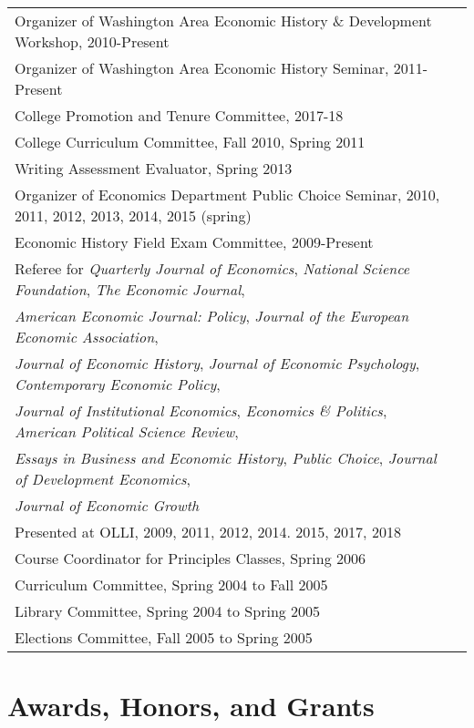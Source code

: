 \documentclass[11pt,fullpage]{article}
\begin{document}
\begin{tabular}{ll}
	Organizer of Washington Area Economic History \& Development Workshop, 2010-Present \\
	Organizer of Washington Area Economic History Seminar, 2011-Present \\
	College Promotion and Tenure Committee, 2017-18 \\
	College Curriculum Committee, Fall 2010, Spring 2011 \\
	Writing Assessment Evaluator, Spring 2013 \\ 
	Organizer of Economics Department Public Choice Seminar, 2010, 2011, 2012, 2013, 2014, 2015 (spring) \\
	Economic History Field Exam Committee, 2009-Present \\
	Referee for \textit{Quarterly Journal of Economics}, \textit{National Science Foundation}, \textit{The Economic Journal}, \\\textit{American Economic Journal:  Policy},  \textit{Journal of the European Economic Association}, \\\textit{Journal of Economic History}, \textit{Journal of Economic Psychology}, \textit{Contemporary Economic Policy},\\ \textit{Journal of Institutional Economics}, \textit{Economics \& Politics}, \textit{American Political Science Review}, \\ \textit{Essays in Business and Economic History}, \textit{Public Choice}, \textit{Journal of Development Economics}, \\ \textit{Journal of Economic Growth} \\ 
	Presented at OLLI, 2009, 2011, 2012, 2014. 2015, 2017, 2018 \\ 
	Course Coordinator for Principles Classes, Spring 2006 \\
	Curriculum Committee, Spring 2004 to Fall 2005 \\
	Library Committee, Spring 2004 to Spring 2005 \\
	Elections Committee, Fall 2005 to Spring 2005 \\
\end{tabular}	
	
\section*{Awards, Honors, and Grants}
\end{document}
